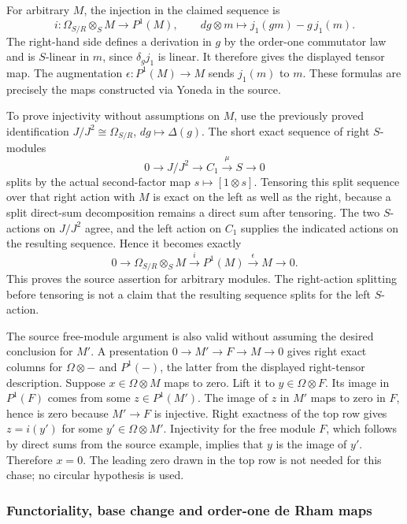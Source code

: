 For arbitrary \(M\), the injection in the claimed sequence is \[
i:\Omega_{S/R}\otimes_SM\longrightarrow P^1(M),\qquad
dg\otimes m\longmapsto j_1(gm)-g\,j_1(m).
\] The right-hand side defines a derivation in \(g\) by the order-one commutator law and is \(S\)-linear in \(m\), since \(\delta_gj_1\) is linear. It therefore gives the displayed tensor map. The augmentation \(\epsilon:P^1(M)\to M\) sends \(j_1(m)\) to \(m\). These formulas are precisely the maps constructed via Yoneda in the source.

To prove injectivity without assumptions on \(M\), use the previously proved identification \(J/J^2\cong\Omega_{S/R}\), \(dg\mapsto\Delta(g)\). The short exact sequence of right \(S\)-modules \[
0\longrightarrow J/J^2\longrightarrow C_1\xrightarrow\mu S\longrightarrow0
\] splits by the actual second-factor map \(s\mapsto[1\otimes s]\). Tensoring this split sequence over that right action with \(M\) is exact on the left as well as the right, because a split direct-sum decomposition remains a direct sum after tensoring. The two \(S\)-actions on \(J/J^2\) agree, and the left action on \(C_1\) supplies the indicated actions on the resulting sequence. Hence it becomes exactly \[
0\longrightarrow\Omega_{S/R}\otimes_SM\xrightarrow{i}P^1(M)\xrightarrow{\epsilon}M\longrightarrow0.
\] This proves the source assertion for arbitrary modules. The right-action splitting before tensoring is not a claim that the resulting sequence splits for the left \(S\)-action.

The source free-module argument is also valid without assuming the desired conclusion for \(M'\). A presentation \(0\to M'\to F\to M\to0\) gives right exact columns for \(\Omega\otimes-\) and \(P^1(-)\), the latter from the displayed right-tensor description. Suppose \(x\in\Omega\otimes M\) maps to zero. Lift it to \(y\in\Omega\otimes F\). Its image in \(P^1(F)\) comes from some \(z\in P^1(M')\). The image of \(z\) in \(M'\) maps to zero in \(F\), hence is zero because \(M'\to F\) is injective. Right exactness of the top row gives \(z=i(y')\) for some \(y'\in\Omega\otimes M'\). Injectivity for the free module \(F\), which follows by direct sums from the source example, implies that \(y\) is the image of \(y'\). Therefore \(x=0\). The leading zero drawn in the top row is not needed for this chase; no circular hypothesis is used.

\subsubsection{Functoriality, base change and order-one de Rham maps}\label{algebra-proof-043-functoriality-base-change-and-order-one-de-rham-maps}

